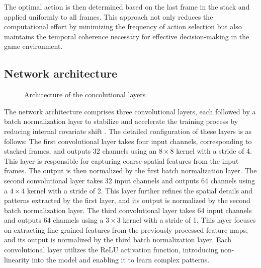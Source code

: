 \documentclass[twocolumn]{webofc}
\begin{document}
The optimal action is then determined based on the last frame in the stack and applied uniformly to all frames. This approach not only reduces the computational effort by minimizing the frequency of action selection but also maintains the temporal coherence necessary for effective decision-making in the game environment.
\subsection{Network architecture}
\begin{figure}[!h]


\caption{Architecture of the concolutional layers}
\label{fig: CNN}
\end{figure}

The network architecture comprises three convolutional layers, each followed by a batch normalization layer to stabilize and accelerate the training process by reducing internal covariate shift \cite{ioffe2015batch}. The detailed configuration of these layers is as follows: The first convolutional layer takes four input channels, corresponding to stacked frames, and outputs 32 channels using an $8\times8$ kernel with a stride of 4. This layer is responsible for capturing coarse spatial features from the input frames. The output is then normalized by the first batch normalization layer. The second convolutional layer takes 32 input channels and outputs 64 channels using a $4\times4$ kernel with a stride of 2. This layer further refines the spatial details and patterns extracted by the first layer, and its output is normalized by the second batch normalization layer. The third convolutional layer takes 64 input channels and outputs 64 channels using a $3\times3$ kernel with a stride of 1. This layer focuses on extracting fine-grained features from the previously processed feature maps, and its output is normalized by the third batch normalization layer. Each convolutional layer utilizes the ReLU activation function, introducing non-linearity into the model and enabling it to learn complex patterns. \cite{nair2010rectified}
\end{document}
